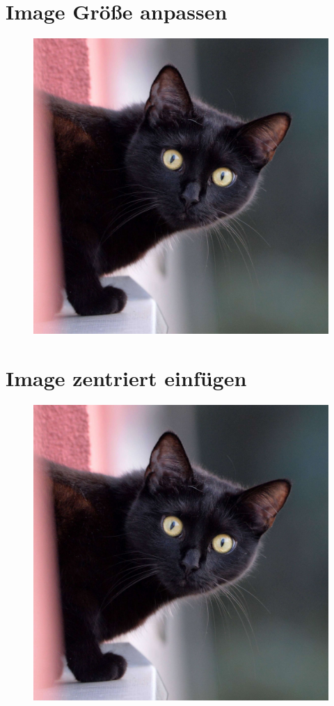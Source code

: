 \documentclass{scrarticle}
\begin{document}
	\section{Image Größe anpassen}
	\begin{figure}[h!hbt]
		\includegraphics[width=0.5\linewidth, height=0.3\textheight]{./Abbildungen/Beispiel.jpg}
	\end{figure}	
	\newpage
	
	\section{Image zentriert einfügen}
	\begin{figure}[h!hbt]
		\centering
		\includegraphics[width=0.5\linewidth]{./Abbildungen/Beispiel.jpg}
	\end{figure}
	\newpage
	
\end{document}
